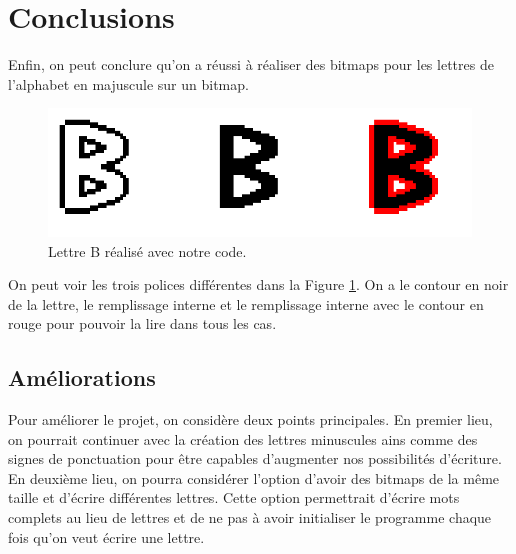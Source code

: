 \documentclass[11pt,a4paper]{article}
\begin{document}
	\newpage
	\section{Conclusions}
	Enfin, on peut conclure qu'on a réussi à réaliser des bitmaps pour les lettres de l'alphabet en majuscule sur un bitmap.
	
	\begin{figure}[ht]
		\centering
		\includegraphics[width=0.8\linewidth]{Images/lettre_B.png}
		\caption{Lettre B réalisé avec notre code.}
		\label{im:lettreB}
	\end{figure}
	
	On peut voir les trois polices différentes dans la Figure \ref{im:lettreB}. On a le contour en noir de la lettre, le remplissage interne et le remplissage interne avec le contour en rouge pour pouvoir la lire dans tous les cas.
	
	
	\subsection{Améliorations}
	Pour améliorer le projet, on considère deux points principales. En premier lieu, on pourrait continuer avec la création des lettres minuscules ains comme des signes de ponctuation pour être capables d'augmenter nos possibilités d'écriture.\\ 
	
	En deuxième lieu, on pourra considérer l'option d'avoir des bitmaps de la même taille et d'écrire différentes lettres. Cette option permettrait d'écrire mots complets au lieu de lettres et de ne pas à avoir initialiser le programme chaque fois qu'on veut écrire une lettre.
	
\end{document}
